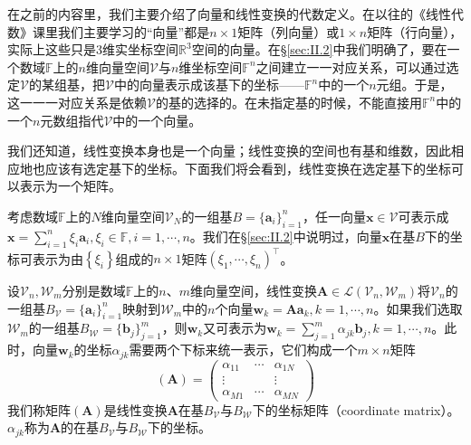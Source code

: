 \documentclass[main.tex]{subfiles}
\begin{document}
在之前的内容里，我们主要介绍了向量和线性变换的代数定义。在以往的《线性代数》课里我们主要学习的“向量”都是$n\times 1$矩阵（列向量）或$1\times n$矩阵（行向量），实际上这些只是3维实坐标空间$\mathbb{R}^3$空间的向量。在\S\ref{sec:II.2}中我们明确了，要在一个数域$\mathbb{F}$上的$n$维向量空间$\mathcal{V}$与$n$维坐标空间$\mathbb{F}^n$之间建立一一对应关系，可以通过选定$\mathcal{V}$的某组基，把$\mathcal{V}$中的向量表示成该基下的坐标——$\mathbb{F}^n$中的一个$n$元组。于是，这一一一对应关系是依赖$\mathcal{V}$的基的选择的。在未指定基的时候，不能直接用$\mathbb{F}^n$中的一个$n$元数组指代$\mathcal{V}$中的一个向量。

我们还知道，线性变换本身也是一个向量；线性变换的空间也有基和维数，因此相应地也应该有选定基下的坐标。下面我们将会看到，线性变换在选定基下的坐标可以表示为一个矩阵\cite[\S7.3“3”,p.~178]{周胜林2012线性代数}。

考虑数域$\mathbb{F}$上的$N$维向量空间$\mathcal{V}_N$的一组基$B=\{\mathbf{a}_i\}_{i=1}^n$，任一向量$\mathbf{x}\in\mathcal{V}$可表示成$\mathbf{x}=\sum_{i=1}^n\xi_i\mathbf{a}_i,\xi_i\in\mathbb{F},i=1,\cdots,n$。我们在\S\ref{sec:II.2}中说明过，向量$\mathbf{x}$在基$B$下的坐标可表示为由$\left\{\xi_i\right\}$组成的$n\times 1$矩阵$\left(\xi_1,\cdots,\xi_n\right)^\intercal$。

设$\mathcal{V}_n,\mathcal{W}_m$分别是数域$\mathbb{F}$上的$n$、$m$维向量空间，线性变换$\mathbf{A}\in\mathcal{L}\left(\mathcal{V}_n,\mathcal{W}_m\right)$将$\mathcal{V}_n$的一组基$B_\mathcal{V}=\{\mathbf{a}_i\}_{i=1}^n$映射到$\mathcal{W}_m$中的$n$个向量$\mathbf{w}_k=\mathbf{Aa}_k,k=1,\cdots,n$。如果我们选取$\mathcal{W}_m$的一组基$B_\mathcal{W}=\{\mathbf{b}_j\}_{j=1}^m$，则$\mathbf{w}_k$又可表示为$\mathbf{w}_k=\sum_{j=1}^m\alpha_{jk}\mathbf{b}_j,k=1,\cdots,n$。此时，向量$\mathbf{w}_k$的坐标$\alpha_{jk}$需要两个下标来统一表示，它们构成一个$m\times n$矩阵
\[\left(\mathbf{A}\right)=\left(\begin{array}{ccc}\alpha_{11}&\cdots&\alpha_{1N}\\\vdots&&\vdots\\\alpha_{M1}&\cdots&\alpha_{MN}\end{array}\right)\]
我们称矩阵$\left(\mathbf{A}\right)$是线性变换$\mathbf{A}$在基$B_\mathcal{V}$与$B_\mathcal{W}$下的坐标矩阵（coordinate matrix）。$\alpha_{jk}$称为$\mathbf{A}$的在基$B_\mathcal{V}$与$B_\mathcal{W}$下的坐标。
\end{document}
